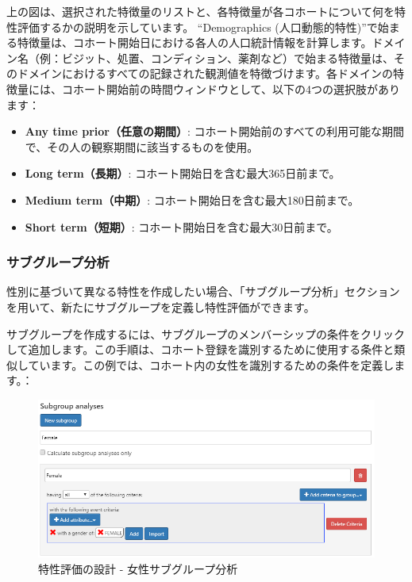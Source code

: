 \documentclass[
  11pt]{book}
\providecommand{\tightlist}{%
  \setlength{\itemsep}{0pt}\setlength{\parskip}{0pt}}
\theoremstyle{definition}
\theoremstyle{definition}
\theoremstyle{definition}
\theoremstyle{definition}
\theoremstyle{remark}
\begin{document}
上の図は、選択された特徴量のリストと、各特徴量が各コホートについて何を特性評価するかの説明を示しています。 ``Demographics (人口動態的特性)''で始まる特徴量は、コホート開始日における各人の人口統計情報を計算します。ドメイン名（例：ビジット、処置、コンディション、薬剤など）で始まる特徴量は、そのドメインにおけるすべての記録された観測値を特徴づけます。各ドメインの特徴量には、コホート開始前の時間ウィンドウとして、以下の4つの選択肢があります：

\begin{itemize}
\tightlist
\item
  \textbf{Any time prior（任意の期間）}: コホート開始前のすべての利用可能な期間で、その人の観察期間に該当するものを使用。
\item
  \textbf{Long term（長期）}: コホート開始日を含む最大365日前まで。
\item
  \textbf{Medium term（中期）}: コホート開始日を含む最大180日前まで。
\item
  \textbf{Short term（短期）}: コホート開始日を含む最大30日前まで。
\end{itemize}

\subsubsection*{サブグループ分析}\label{ux30b5ux30d6ux30b0ux30ebux30fcux30d7ux5206ux6790}

性別に基づいて異なる特性を作成したい場合、「サブグループ分析」セクションを用いて、新たにサブグループを定義し特性評価ができます。

サブグループを作成するには、サブグループのメンバーシップの条件をクリックして追加します。この手順は、コホート登録を識別するために使用する条件と類似しています。この例では、コホート内の女性を識別するための条件を定義します。：

\begin{figure}

{\centering \includegraphics[width=1\linewidth]{images/Characterization/atlasCharacterizationSubgroup} 

}

\caption{特性評価の設計 - 女性サブグループ分析}\label{fig:atlasCharacterizationSubgroup}
\end{figure}
\end{document}
